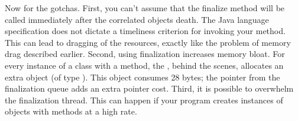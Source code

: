Now for the gotchas. First, you can't assume that the finalize method will be
called immediately after the correlated objects death. The Java language
specification does not dictate a timeliness criterion for invoking your
 method. This can lead to dragging of the resources, exactly like
the problem of memory drag described earlier. Second, using finalization
increases memory bloat. For every instance of a class with a 
method, the \jre, behind the scenes, allocates an extra object (of type
). This object consumes 28 bytes; the
pointer from the finalization queue adds an extra pointer cost.
Third, it is possible to overwhelm the finalization thread. This can happen if
your program creates instances of objects with  methods at a high
rate.

